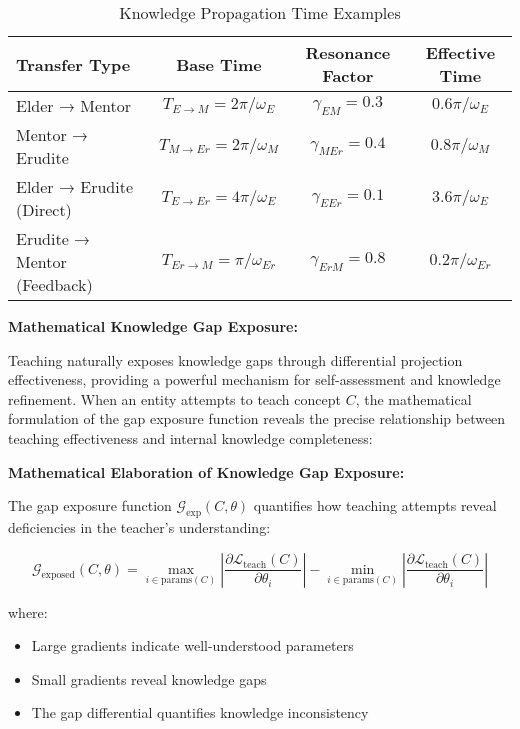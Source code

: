\begin{table}[h]
\centering
\caption{Knowledge Propagation Time Examples}
\label{tab:propagation_times}
\begin{tabular}{|l|c|c|c|}
\hline
\textbf{Transfer Type} & \textbf{Base Time} & \textbf{Resonance Factor} & \textbf{Effective Time} \\
\hline
Elder → Mentor & $T_{E→M} = 2\pi/\omega_E$ & $\gamma_{EM} = 0.3$ & $0.6\pi/\omega_E$ \\
Mentor → Erudite & $T_{M→Er} = 2\pi/\omega_M$ & $\gamma_{M Er} = 0.4$ & $0.8\pi/\omega_M$ \\
Elder → Erudite (Direct) & $T_{E→Er} = 4\pi/\omega_E$ & $\gamma_{E Er} = 0.1$ & $3.6\pi/\omega_E$ \\
Erudite → Mentor (Feedback) & $T_{Er→M} = \pi/\omega_{Er}$ & $\gamma_{Er M} = 0.8$ & $0.2\pi/\omega_{Er}$ \\
\hline
\end{tabular}
\end{table}

\textbf{Mathematical Knowledge Gap Exposure:}

Teaching naturally exposes knowledge gaps through differential projection effectiveness, providing a powerful mechanism for self-assessment and knowledge refinement. When an entity attempts to teach concept $C$, the mathematical formulation of the gap exposure function reveals the precise relationship between teaching effectiveness and internal knowledge completeness:

\textbf{Mathematical Elaboration of Knowledge Gap Exposure:}

The gap exposure function $\mathcal{G}_{\text{exp}}(C, \theta)$ quantifies how teaching attempts reveal deficiencies in the teacher's understanding:

\begin{equation}
\mathcal{G}_{\text{exposed}}(C, \theta) = \max_{i \in \text{params}(C)} \left| \frac{\partial \mathcal{L}_{\text{teach}}(C)}{\partial \theta_i} \right| - \min_{i \in \text{params}(C)} \left| \frac{\partial \mathcal{L}_{\text{teach}}(C)}{\partial \theta_i} \right|
\end{equation}

where:
\begin{itemize}
    \item Large gradients indicate well-understood parameters
    \item Small gradients reveal knowledge gaps
    \item The gap differential quantifies knowledge inconsistency
\end{itemize}

